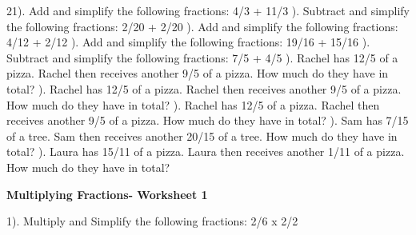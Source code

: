 \documentclass{article}%
\begin{document}
21). Add and simplify the following fractions: 4/3 + 11/3%
\newline%
\newline%
). Subtract and simplify the following fractions: 2/20 + 2/20%
\newline%
\newline%
). Add and simplify the following fractions: 4/12 + 2/12%
\newline%
\newline%
). Add and simplify the following fractions: 19/16 + 15/16%
\newline%
\newline%
). Subtract and simplify the following fractions: 7/5 + 4/5%
\newline%
\newline%
). Rachel has 12/5 of a pizza. Rachel then receives another 9/5 of a pizza. How much do they have in total?%
\newline%
\newline%
). Rachel has 12/5 of a pizza. Rachel then receives another 9/5 of a pizza. How much do they have in total?%
\newline%
\newline%
). Rachel has 12/5 of a pizza. Rachel then receives another 9/5 of a pizza. How much do they have in total?%
\newline%
\newline%
). Sam has 7/15 of a tree. Sam then receives another 20/15 of a tree. How much do they have in total?%
\newline%
\newline%
). Laura has 15/11 of a pizza. Laura then receives another 1/11 of a pizza. How much do they have in total?%
\newline%
\newline%
\newline%
\pagebreak%
\large%
\begin{center}%
\textbf{Multiplying Fractions- Worksheet 1}%
\newline%
\end{center} \normalsize%
1). Multiply and Simplify the following fractions: 2/6 x 2/2%
\end{document}

